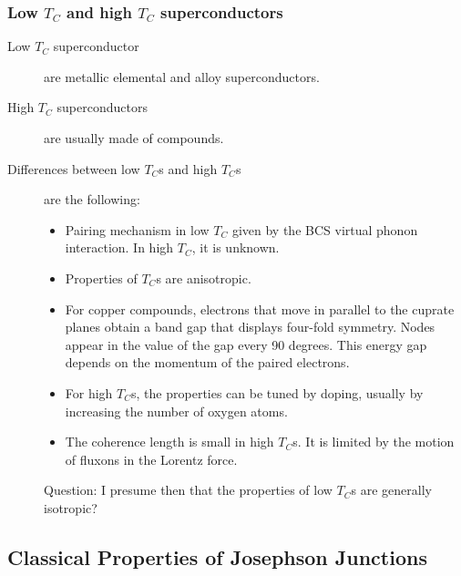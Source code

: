 \subsubsection{Low $T_C$ and high $T_C$ superconductors}
\begin{description}
\item[Low $T_C$ superconductor] are metallic elemental and alloy superconductors. 

\item[High $T_C$ superconductors]  are usually made of compounds. 

\item[Differences between low $T_C$s and high $T_C$s] are the following:
\begin{itemize}
\item Pairing mechanism in low $T_C$ given by the BCS virtual phonon interaction. In high $T_C$, it is unknown. 
\item Properties of $T_C$s are anisotropic. 
\item For copper compounds, electrons that move in parallel to the cuprate planes obtain a band gap that displays four-fold symmetry. Nodes appear in the value of the gap every 90 degrees. This energy gap depends on the momentum of the paired electrons. 
\item For high $T_C$s, the properties can be tuned by doping, usually by increasing the number of oxygen atoms. 
\item The coherence length is small in high $T_C$s. It is limited by the motion of fluxons in the Lorentz force. 
\end{itemize}

Question: I presume then that the properties of low $T_C$s are generally isotropic? 


\end{description}
\subsection{Classical Properties of Josephson Junctions}
